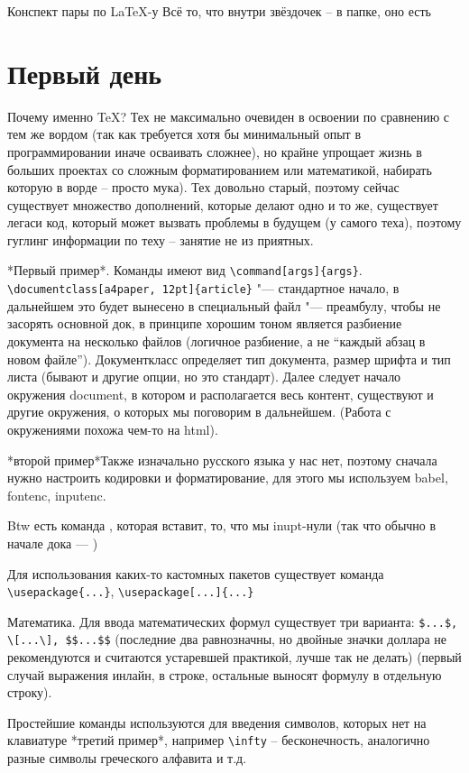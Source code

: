 \documentclass[a4paper, 12pt]{article}
\begin{document}
Конспект пары по LaTeX-у
Всё то, что внутри звёздочек – в папке, оно есть
\section{Первый день}
Почему именно TeX? Тех не максимально очевиден в освоении по сравнению с тем же вордом (так как требуется хотя бы минимальный опыт в программировании иначе осваивать сложнее), но крайне упрощает жизнь в больших проектах со сложным форматированием или математикой, набирать которую в ворде – просто мука). Тех довольно старый, поэтому сейчас существует множество дополнений, которые делают одно и то же, существует легаси код, который может вызвать проблемы в будущем (у самого теха), поэтому гуглинг информации по теху – занятие не из приятных.

*Первый пример*. Команды имеют вид \verb*|\command[args]{args}|. \verb*|\documentclass[a4paper, 12pt]{article}| "--- стандартное начало, в дальнейшем это будет вынесено в специальный файл "--- преамбулу, чтобы не засорять основной док, в принципе хорошим тоном является разбиение документа на несколько файлов (логичное разбиение, а не “каждый абзац в новом файле”). Документкласс определяет тип документа, размер шрифта и тип листа (бывают и другие опции, но это стандарт). Далее следует начало окружения document, в котором и располагается весь контент, существуют и другие окружения, о которых мы поговорим в дальнейшем. (Работа с окружениями похожа чем-то на html).

*второй пример*Также изначально русского языка у нас нет, поэтому сначала нужно настроить кодировки и форматирование, для этого мы используем babel, fontenc, inputenc.

Btw есть команда \verb||, которая вставит, то, что мы inupt-нули (так что обычно в начале дока --- \verb||)

Для использования каких-то кастомных пакетов существует команда \verb|\usepackage{...}|, \verb|\usepackage[...]{...}|

Математика. Для ввода математических формул существует три варианта: \verb|$...$, \[...\], $$...$$| (последние два равнозначны, но двойные значки доллара не рекомендуются и считаются устаревшей практикой, лучше так не делать) (первый случай выражения инлайн, в строке, остальные выносят формулу в отдельную строку).

Простейшие команды используются для введения символов, которых нет на клавиатуре *третий пример*, например \verb|\infty| – бесконечность, аналогично разные символы греческого алфавита и т.д.
\end{document}
